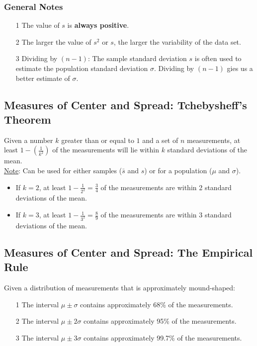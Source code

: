 \documentclass[12pt, letterpaper]{article}
\begin{document}
            \subsubsection*{General Notes}
                \begin{itemize}
                    \item[1] The value of $s$ is \textbf{always positive}.
                    \item[2] The larger the value of $s^2$ or $s$, the larger the variability of the data set.
                    \item[3] Dividing by $(n - 1)$: The sample standard deviation $s$ is often used to estimate the population standard deviation $\sigma$. Dividing by $(n - 1)$ gies us a better estimate of $\sigma$. 
                \end{itemize}
        
        \subsection{Measures of Center and Spread: Tchebysheff's Theorem}
            Given a number $k$ greater than or equal to $1$ and a set of $n$ measurements, at least $1 - (\frac{1}{k^2})$ of the measurements will lie within $k$ standard deviations of the mean. \\ \underline{Note}: Can be used for either samples ($\bar{s}$ and $s$) or for a population ($\mu$ and $\sigma$).
            \begin{itemize}
                \item If $k = 2$, at least $1 - \frac{1}{2^2} = \frac{3}{4}$ of the measurements are within 2 standard deviations of the mean.
                \item If $k = 3$, at least $1 - \frac{1}{3^2} = \frac{8}{9}$ of the measurements are within 3 standard deviations of the mean.
            \end{itemize}
        
        \subsection{Measures of Center and Spread: The Empirical Rule}
            Given a distribution of measurements that is approximately mound-shaped:
            \begin{itemize}
                \item[1] The interval $\mu \pm \sigma$ contains approximately 68\% of the measurements.
                \item[2] The interval $\mu \pm 2\sigma$ contains approximately 95\% of the measurements.
                \item[3] The interval $\mu \pm 3\sigma$ contains approximately 99.7\% of the measurements.
            \end{itemize}
        
\end{document}
